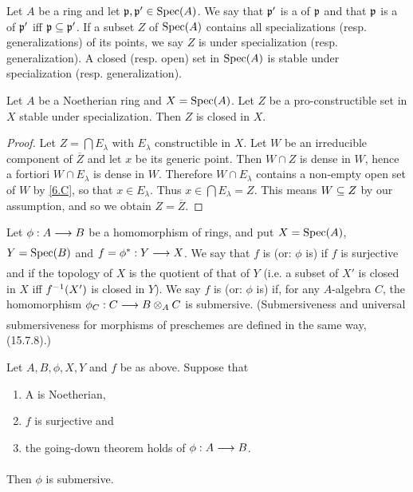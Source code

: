 \documentclass[../main]{subfiles}
\begin{document}
\newparagraph Let $A$ be a ring and let $\mathfrak{p}, \mathfrak{p}' \in \operatorname{Spec}(A)$. We say that $\mathfrak{p}'$ is a  of $\mathfrak{p}$ and that $\mathfrak{p}$ is a  of $\mathfrak{p}'$ iff $\mathfrak{p} \subseteq \mathfrak{p}'$. If a subset $Z$ of $\operatorname{Spec}(A)$ contains all specializations (resp. generalizations) of its points, we say $Z$ is  under specialization (resp. generalization). A closed (resp. open) set in $\operatorname{Spec}(A)$ is stable under specialization (resp. generalization). 

\begin{lemma} \label{lem:06.04}
Let $A$ be a Noetherian ring and $X = \operatorname{Spec}(A)$. Let $Z$ be a pro-constructible set in $X$ stable under specialization. Then $Z$ is closed in $X$.
\end{lemma}

\begin{proof}
Let $Z = \bigcap E_\lambda$ with $E_\lambda$ constructible in $X$. Let $W$ be an irreducible component of $\overline{Z}$ and let $x$ be its generic point. Then $W \cap Z$ is dense in $W$, hence a fortiori $W \cap E_\lambda$ is dense in $W$. Therefore $W \cap E_\lambda$ contains a non-empty open set of $W$ by \ref{6.C}, so that $x \in E_\lambda$. Thus $ x \in \bigcap E_\lambda = Z$. This means $W \subseteq Z$ by our assumption, and so we obtain $Z = \overline{Z}$.
\end{proof}

\newparagraph Let $\phi: A \varrightarrow{} B$ be a homomorphism of rings, and put $X = \operatorname{Spec}(A)$, $Y= \operatorname{Spec}(B)$ and $f = \SpecInduced{\phi}: Y \varrightarrow{} X$. We say that $f$ is (or: $\phi$ is)  if $f$ is surjective and if the topology of $X$ is the quotient of that of $Y$ (i.e. a subset of $X'$ is closed in $X$ iff $f^{-1}(X')$ is closed in $Y$). We say $f$ is (or: $\phi$ is)  if, for any $A$-algebra $C$, the homomorphism $\phi_C : C \varrightarrow{} B \otimes_A C$ is submersive. (Submersiveness and universal submersiveness for morphisms of preschemes are defined in the same way, \cite{egaIV} (15.7.8).)

\begin{theorem} \label{thm:007}
Let $A, B, \phi, X, Y$ and $f$ be as above. Suppose that 
\begin{enumerate}[label = (\arabic*)]
    \item A is Noetherian, 
    \item $f$ is surjective and
    \item the going-down theorem holds of $\phi: A \varrightarrow{} B$.
\end{enumerate}
Then $\phi$ is submersive.
\end{theorem}
\end{document}
